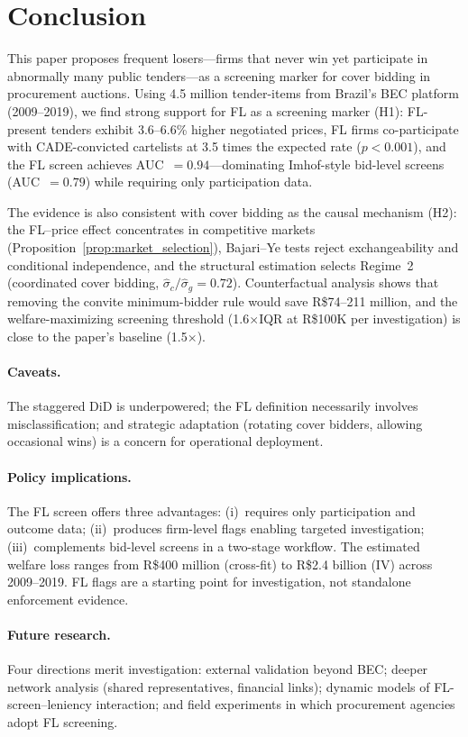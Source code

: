 \section{Conclusion} %
\label{sec:conclusion}

This paper proposes frequent losers---firms that never win yet
participate in abnormally many public tenders---as a screening marker for
cover bidding in procurement auctions. Using 4.5 million tender-items
from Brazil's BEC platform (2009--2019), we find strong support for
FL as a screening marker (H1): FL-present tenders exhibit
3.6--6.6\% higher negotiated prices, FL firms co-participate with
CADE-convicted cartelists at 3.5 times the expected rate
($p < 0.001$), and the FL screen achieves AUC~$= 0.94$---dominating
Imhof-style bid-level screens (AUC~$= 0.79$) while requiring only
participation data.

The evidence is also consistent with cover bidding as the causal
mechanism (H2): the FL--price effect concentrates in competitive
markets (Proposition~\ref{prop:market_selection}), Bajari--Ye tests
reject exchangeability and conditional independence, and the
structural estimation selects Regime~2 (coordinated cover bidding,
$\hat{\sigma}_c / \hat{\sigma}_g = 0.72$). Counterfactual analysis
shows that removing the convite minimum-bidder rule would save
R\$74--211 million, and the welfare-maximizing screening threshold
(1.6$\times$IQR at R\$100K per investigation) is close to the
paper's baseline (1.5$\times$).

\paragraph{Caveats.}
The staggered DiD is underpowered; the FL definition necessarily
involves misclassification; and strategic adaptation (rotating cover
bidders, allowing occasional wins) is a concern for operational
deployment.

\paragraph{Policy implications.}
The FL screen offers three advantages: (i)~requires only participation
and outcome data; (ii)~produces firm-level flags enabling targeted
investigation; (iii)~complements bid-level screens in a two-stage
workflow. The estimated welfare loss ranges from R\$400 million
(cross-fit) to R\$2.4 billion (IV) across 2009--2019. FL flags are
a starting point for investigation, not standalone enforcement evidence.

\paragraph{Future research.}
Four directions merit investigation: external validation beyond BEC;
deeper network analysis (shared representatives, financial links);
dynamic models of FL-screen--leniency interaction; and field
experiments in which procurement agencies adopt FL screening.
